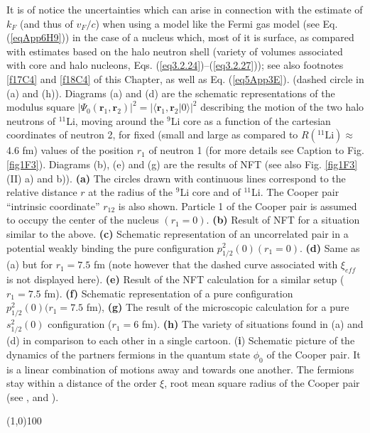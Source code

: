 {         	It is of notice the uncertainties which can arise in connection with the estimate of $k_F$ (and thus of $v_F/c$) when using a model like the Fermi gas model (see Eq. (\ref{eqApp6H9})) in the case of a nucleus which, most of it is surface, as compared with estimates based on the halo neutron shell (variety of volumes associated with core and halo nucleons, Eqs. (\ref{eq3.2.24})--(\ref{eq3.2.27})); see also footnotes \ref{f17C4} and \ref{f18C4} of this Chapter, as well as Eq. (\ref{eq5App3E}).    
         } (dashed circle in (a) and (h)). Diagrams (a) and (d) are the schematic representations of the modulus square $|\Psi_0(\mathbf r_1, \mathbf r_2)|^2=|\langle\mathbf r_1, \mathbf r_2|0\rangle|^2$ describing the motion of the two halo neutrons of $^{11}$Li, moving around the $^{9}$Li core as a function of the cartesian coordinates of neutron 2, for fixed (small and large as compared to $R(^{11}\text{Li})\approx$4.6 fm) values of the position $r_1$ of neutron 1 (for more details see Caption to Fig. \ref{fig1F3}). Diagrams (b), (e) and (g) are the results of NFT (see also Fig. \ref{fig1F3} (II) a) and b)). \textbf{(a)} The  circles drawn with continuous lines correspond to the relative distance $r$ at the radius of the $^{9}$Li core and of $^{11}$Li. The Cooper pair ``intrinsic coordinate'' $r_{12}$ is also shown. Particle 1 of the Cooper pair is assumed to occupy the center of the nucleus $(r_1=0)$. \textbf{(b)} Result of NFT for a situation similar to the above. \textbf{(c)} Schematic representation of an uncorrelated pair in a potential weakly binding the pure configuration $p^2_{1/2}(0) (r_1=0)$. \textbf{(d)} Same as (a) but for $r_1=7.5$ fm (note however that the dashed curve associated with $\xi_{eff}$ is not displayed here). \textbf{(e)} Result of the NFT calculation for a similar setup ($r_1=7.5$ fm). \textbf{(f)} Schematic representation of a pure configuration $p^2_{1/2}(0) (r_1=7.5$ fm), \textbf{(g)} The result of the microscopic calculation for a  pure $s^2_{1/2}(0)$ configuration ($r_1=6$ fm). \textbf{(h)} The variety of situations found in (a) and (d) in comparison to each other in a single cartoon. (\textbf{i}) Schematic picture of the dynamics of the partners fermions in the quantum state $\phi_0$ of the Cooper pair. It is a linear combination of motions away and towards one another. The fermions stay within a distance of the order $\xi$, root mean square radius of the Cooper pair (see \cite{Weisskopf:81}, \cite{Kadin:07} and \cite{VanWitsen:14}).
\begin{center}
	\line(1,0){100}
\end{center}
         
